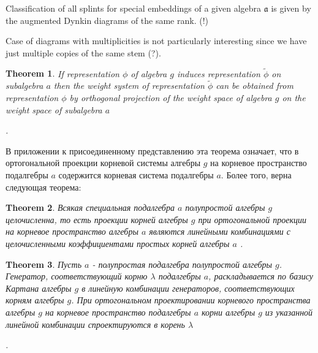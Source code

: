 \documentclass{article}
\newtheorem{theorem}{Theorem}
\begin{document}
Classification of all splints for special embeddings of a given algebra $\mathfrak{a}$ is given by
the augmented Dynkin diagrams of the same rank. (!)

Case of diagrams with multiplicities is not particularly interesting since we have just multiple
copies of the same stem (?).


\begin{theorem}\label{dyn0}
  If representation $\phi$ of algebra $g$ induces representation $\tilde\phi$ on subalgebra $a$ then
  the weight system of representation $\tilde\phi$ can be obtained from representation $\phi$ by
  orthogonal projection of the weight space of algebra $g$ on the weight space of subalgebra $a$

  \cite{dynkin1952maximal}. %
\end{theorem}

В приложении к присоединенному представлению эта теорема означает, что в ортогональной проекции
корневой системы алгебры $g$ на корневое пространство подалгебры $a$ содержится корневая система
подалгебры $a$. Более того, верна следующая теорема:

\begin{theorem}\label{dyn1}
Всякая специальная подалгебра $a$ полупростой алгебры $g$ целочисленна, то есть проекции корней алгебры $g$ при ортогональной проекции на корневое пространство алгебры $a$ являются линейными комбинациями с целочисленными коэффициентами простых корней алгебры $a$ \cite{dynkin1972semisimple,dynkin1952semisimple}. %
\end{theorem}

\begin{theorem}\label{dyn2}
  Пусть $a$ - полупростая подалгебра полупростой алгебры $g$. Генератор, соответствующий корню
  $\lambda$ подалгебры $a$, раскладывается по базису Картана алгебры $g$ в линейную комбинации
  генераторов, соответствующих корням алгебры $g$. При ортогональном проектировании корневого
  пространства алгебры $g$ на корневое пространство подалгебры $a$ корни алгебры $g$ из указанной
  линейной комбинации спроектируются в корень $\lambda$

  \cite{dynkin1972semisimple,dynkin1952semisimple}. %
\end{theorem}
\end{document}
